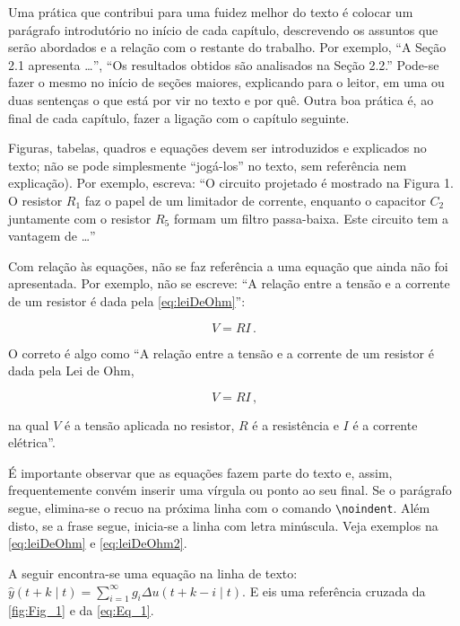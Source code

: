 Uma prática que contribui para uma fuidez melhor do texto é colocar um parágrafo introdutório no início de cada capítulo, descrevendo os assuntos que serão abordados e a relação com o restante do trabalho. Por exemplo, ``A Seção 2.1 apresenta \ldots'', ``Os resultados obtidos são analisados na Seção 2.2.'' Pode-se fazer o mesmo no início de seções maiores, explicando para o leitor, em uma ou duas sentenças o que está por vir no texto e por quê. Outra boa prática é, ao final de cada capítulo, fazer a ligação com o capítulo seguinte.

Figuras, tabelas, quadros e equações devem ser introduzidos e explicados no texto; não se pode simplesmente ``jogá-los'' no texto, sem referência nem explicação). Por exemplo, escreva: ``O circuito projetado é mostrado na Figura 1. O resistor $R_1$ faz o papel de um limitador de corrente, enquanto o capacitor $C_2$ juntamente com o resistor $R_5$ formam um filtro passa-baixa. Este circuito tem a vantagem de \ldots''

Com relação às equações, não se faz referência a uma equação que ainda não foi apresentada. Por exemplo, não se escreve: ``A relação entre a tensão e a corrente de um resistor é dada pela \autoref{eq:leiDeOhm}'':

\begin{equation}
    V = R I \, \text{.}
    \label{eq:leiDeOhm}
\end{equation}

\noindent O correto é algo como ``A relação entre a tensão e a corrente de um resistor é dada pela Lei de Ohm,

\begin{equation}
    V = R I \, \text{,}
    \label{eq:leiDeOhm2}
\end{equation}

\noindent na qual $V$ é a tensão aplicada no resistor, $R$ é a resistência e $I$ é a corrente elétrica''.

É importante observar que as equações fazem parte do texto e, assim, frequentemente convém inserir uma vírgula ou ponto ao seu final. Se o parágrafo segue, elimina-se o recuo na próxima linha com o comando \verb!\noindent!. Além disto, se a frase segue, inicia-se a linha com letra minúscula. Veja exemplos na \autoref{eq:leiDeOhm} e \autoref{eq:leiDeOhm2}.



A seguir encontra-se uma equação na linha de texto: $\hat{y}(t+k\mid t)= \sum^\infty_{i=1} g_i \Delta u(t+k-i\mid t)$. E eis uma referência cruzada da \autoref{fig:Fig_1} e da \autoref{eq:Eq_1}.


